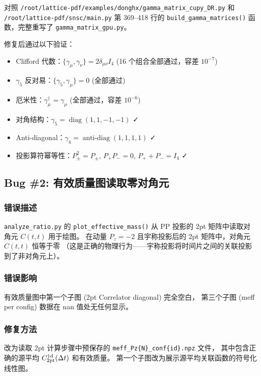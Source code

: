\documentclass[11pt,a4paper]{article}
\begin{document}
对照 \texttt{/root/lattice-pdf/examples/donghx/gamma\_matrix\_cupy\_DR.py}
和 \texttt{/root/lattice-pdf/snsc/main.py} 第 369--418 行的
\texttt{build\_gamma\_matrices()} 函数，完整重写了 \texttt{gamma\_matrix\_gpu.py}。

修复后通过以下验证：
\begin{itemize}
  \item Clifford 代数：$\{\gamma_\mu, \gamma_\nu\} = 2\delta_{\mu\nu} I_4$
    (16 个组合全部通过，容差 $10^{-7}$)
  \item $\gamma_5$ 反对易：$\{\gamma_5, \gamma_\mu\} = 0$ (全部通过)
  \item 厄米性：$\gamma_\mu^{\dag} = \gamma_\mu$ (全部通过，容差 $10^{-6}$)
  \item 对角结构：$\gamma_5 = \operatorname{diag}(1,1,-1,-1)$ ✓
  \item Anti-diagonal：$\gamma_4 = \operatorname{anti-diag}(1,1,1,1)$ ✓
  \item 投影算符幂等性：$P_{\pm}^2 = P_{\pm}$, $P_+P_- = 0$, $P_+ + P_- = I_4$ ✓
\end{itemize}

\subsection{Bug \#2: 有效质量图读取零对角元}

\subsubsection*{错误描述}

\texttt{analyze\_ratio.py} 的 \texttt{plot\_effective\_mass()} 从 PP 投影的
2pt 矩阵中读取对角元 $C(t,t)$ 用于绘图。
在动量 $P_z = -2$ 且宇称投影后的 2pt 矩阵中，对角元 $C(t,t)$ 恒等于零
（这是正确的物理行为——宇称投影将时间片之间的关联投影到了非对角元上）。

\subsubsection*{错误影响}
有效质量图中第一个子图 (2pt Correlator diagonal) 完全空白，
第三个子图 (meff per config) 数据在 nan 值处无任何显示。

\subsubsection*{修复方法}
改为读取 2pt 计算步骤中预保存的 \texttt{meff\_Pz\{N\}\_conf\{id\}.npz} 文件，
其中包含正确的源平均 $C_{\rm 2pt}^{\rm 1d}(\Delta t)$ 和有效质量。
第一个子图改为展示源平均关联函数的符号化线性图。
\end{document}
